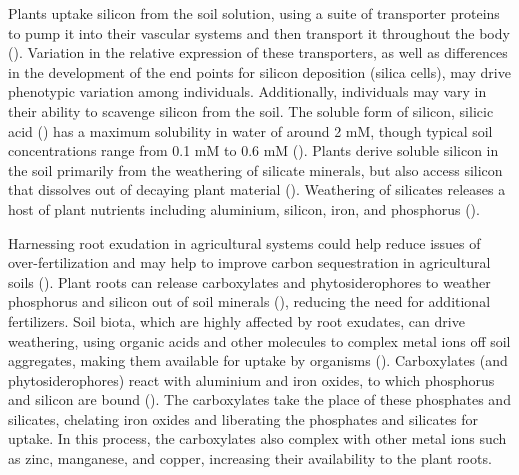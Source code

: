\documentclass[12pt, letterpaper]{report}
\begin{document}
Plants uptake silicon from the soil solution, using a suite of transporter proteins to pump it into their vascular systems and then transport it throughout the body (\cite{reynolds_silicon_2016}).  Variation in the relative expression of these transporters, as well as differences in the development of the end points for silicon deposition (silica cells), may drive phenotypic variation among individuals. Additionally, individuals may vary in their ability to scavenge silicon from the soil. The soluble form of silicon, silicic acid () has a maximum solubility in water of around 2 mM, though typical soil concentrations range from 0.1 mM to 0.6 mM (\cite{epstein_anomaly_1994}). Plants derive soluble silicon in the soil primarily from the weathering of silicate minerals, but also access silicon that dissolves out of decaying plant material (\cite{de_tombeur_silicon_2021-1}). Weathering of silicates releases a host of plant nutrients including aluminium, silicon, iron, and phosphorus (\cite{de_tombeur_silicon_2021-1}). 

Harnessing root exudation in agricultural systems could help reduce issues of over-fertilization and may help to improve carbon sequestration in agricultural soils (\cite{cornelis_soil_2022,panchal_soil_2022}). Plant roots can release carboxylates and phytosiderophores to weather phosphorus and silicon out of soil minerals (\cite{de_tombeur_silicon_2021-1}), reducing the need for additional fertilizers. Soil biota, which are highly affected by root exudates, can drive weathering, using organic acids and other molecules to complex metal ions off soil aggregates, making them available for uptake by organisms (\cite{de_tombeur_silicon_2021}). Carboxylates (and phytosiderophores) react with aluminium and iron oxides, to which phosphorus and silicon are bound (\cite{lambers_leaf_2015}). The carboxylates take the place of these phosphates and silicates, chelating iron oxides and liberating the phosphates and silicates for uptake. In this process, the carboxylates also complex with other metal ions such as zinc, manganese, and copper, increasing their availability to the plant roots. 
\end{document}
